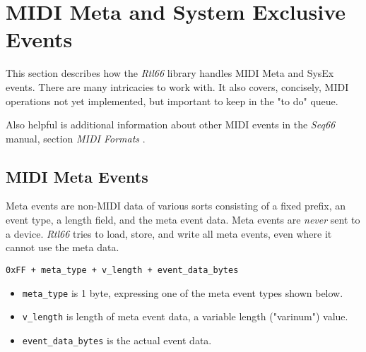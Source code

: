 %
%
%

\section{MIDI Meta and System Exclusive Events}
\label{sec:midi_and_midi_notes}

   This section describes how the \textsl{Rtl66} library handles MIDI
   Meta and SysEx events.  There are many intricacies to work with.
   It also covers, concisely, MIDI operations not yet implemented, but
   important to keep in the "to do" queue.

   Also helpful is additional information about other MIDI events in the
   \textsl{Seq66} manual, section \textsl{MIDI Formats}
   \cite{seq66}.

\subsection{MIDI Meta Events}
\label{subsec:midi_meta_events}

   Meta events are non-MIDI data of various sorts consisting of a fixed prefix,
   an event type, a length field, and the meta event data.
   Meta events are \textsl{never} sent to a device.
   \textsl{Rtl66} tries to load, store, and write all meta events, even
   where it cannot use the meta data.
 
   \texttt{0xFF + meta\_type + v\_length + event\_data\_bytes}

   \begin{itemize}
      \item \texttt{meta\_type} is 1 byte, expressing one of the meta event
         types shown below.
      \item \texttt{v\_length} is length of meta event data, a variable
         length ("varinum") value.
      \item \texttt{event\_data\_bytes} is the actual event data.
   \end{itemize}


